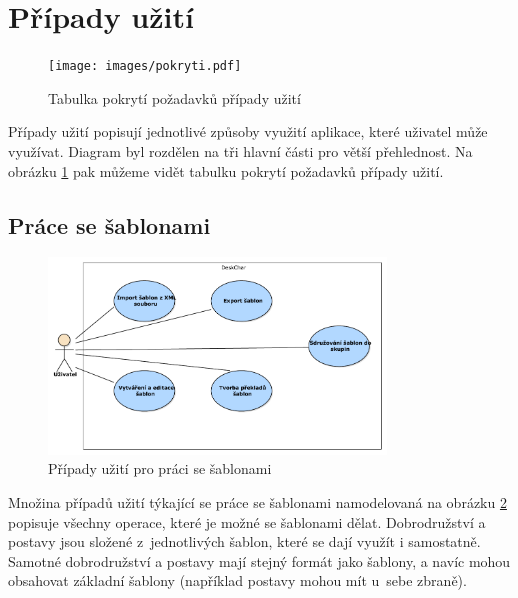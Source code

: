 \documentclass[thesis=B,czech]{resources/FITthesis}[2012/06/26]
\begin{document}
	\section{Případy užití}	
	\label{part:usecase}
	\begin{figure}\centering
		\texttt{[image: images/pokryti.pdf]}
		\caption[Tabulka pokrytí požadavků případy užití]{Tabulka pokrytí požadavků případy užití}
		\label{fig:pokryti}
	\end{figure}
Případy užití popisují jednotlivé způsoby využití aplikace, které uživatel může využívat. Diagram byl rozdělen na tři hlavní části pro větší přehlednost. Na obrázku \ref{fig:pokryti} pak můžeme vidět tabulku pokrytí požadavků případy užití.

\subsection{Práce se šablonami}
	\begin{figure}\centering
		\includegraphics[width=0.8\textwidth]{images/usecase-sablony.pdf}
		\caption[Případy užití pro šablony]{Případy užití pro práci se šablonami}			\label{fig:uc_sablony}
	\end{figure}

Množina případů užití týkající se práce se šablonami namodelovaná na obrázku \ref{fig:uc_sablony} popisuje všechny operace, které je možné se šablonami dělat. Dobrodružství a postavy jsou složené z~jednotlivých šablon, které se dají využít i samostatně. Samotné dobrodružství a postavy mají stejný formát jako šablony, a navíc mohou obsahovat základní šablony (například postavy mohou mít u~sebe zbraně).
\end{document}
